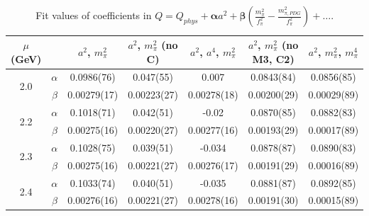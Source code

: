 \documentclass[12pt]{extarticle}
\begin{document}
\begin{table}[h!]
\begin{center}
\begin{tabular}{|c c|c|c|c|c|c|}
\hline
$\mu$ (GeV) &  & $a^2$, $m_\pi^2$& $a^2$, $m_\pi^2$ (no C)& $a^2$, $a^4$, $m_\pi^2$& $a^2$, $m_\pi^2$ (no M3, C2)& $a^2$, $m_\pi^2$, $m_\pi^4$\\
\hline
\multirow{2}{0.5in}{2.0} & $\alpha$ & 0.0986(76)& 0.047(55)& 0.007& 0.0843(84)& 0.0856(85)\\
 & $\beta$ & 0.00279(17)& 0.00223(27)& 0.00278(18)& 0.00200(29)& 0.00029(89)\\
\hline
\multirow{2}{0.5in}{2.2} & $\alpha$ & 0.1018(71)& 0.042(51)& -0.02& 0.0870(85)& 0.0882(83)\\
 & $\beta$ & 0.00275(16)& 0.00220(27)& 0.00277(16)& 0.00193(29)& 0.00017(89)\\
\hline
\multirow{2}{0.5in}{2.3} & $\alpha$ & 0.1028(75)& 0.039(51)& -0.034& 0.0878(87)& 0.0890(83)\\
 & $\beta$ & 0.00275(16)& 0.00221(27)& 0.00276(17)& 0.00191(29)& 0.00016(89)\\
\hline
\multirow{2}{0.5in}{2.4} & $\alpha$ & 0.1033(74)& 0.040(51)& -0.035& 0.0881(87)& 0.0892(85)\\
 & $\beta$ & 0.00276(16)& 0.00221(27)& 0.00278(16)& 0.00191(30)& 0.00015(89)\\
\hline
\end{tabular}
\caption{Fit values of coefficients in $Q = Q_{phys} + \mathbf{\alpha} a^2 + \mathbf{\beta}\left(\frac{m_\pi^2}{f_\pi^2}-\frac{m_{\pi,PDG}^2}{f_\pi^2}\right) + \ldots$.}
\end{center}
\end{table}




















\clearpage
\end{document}
